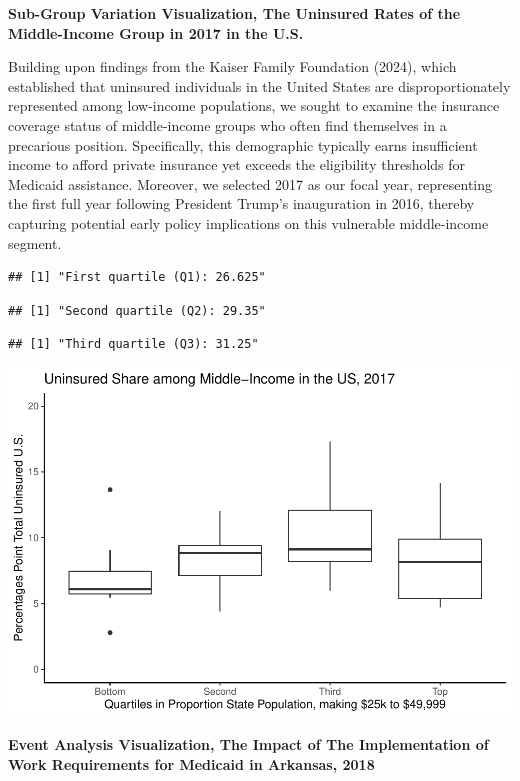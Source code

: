 \documentclass[
]{article}
\begin{document}
\textbf{Sub-Group Variation Visualization, The Uninsured Rates of the
Middle-Income Group in 2017 in the U.S.}

Building upon findings from the Kaiser Family Foundation (2024), which
established that uninsured individuals in the United States are
disproportionately represented among low-income populations, we sought
to examine the insurance coverage status of middle-income groups who
often find themselves in a precarious position. Specifically, this
demographic typically earns insufficient income to afford private
insurance yet exceeds the eligibility thresholds for Medicaid
assistance. Moreover, we selected 2017 as our focal year, representing
the first full year following President Trump's inauguration in 2016,
thereby capturing potential early policy implications on this vulnerable
middle-income segment.

\begin{verbatim}
## [1] "First quartile (Q1): 26.625"
\end{verbatim}

\begin{verbatim}
## [1] "Second quartile (Q2): 29.35"
\end{verbatim}

\begin{verbatim}
## [1] "Third quartile (Q3): 31.25"
\end{verbatim}

\includegraphics[width=0.8\linewidth]{template_files/figure-latex/visualization subgroup-1}

\textbf{Event Analysis Visualization, The Impact of The Implementation
of Work Requirements for Medicaid in Arkansas, 2018}
\end{document}

